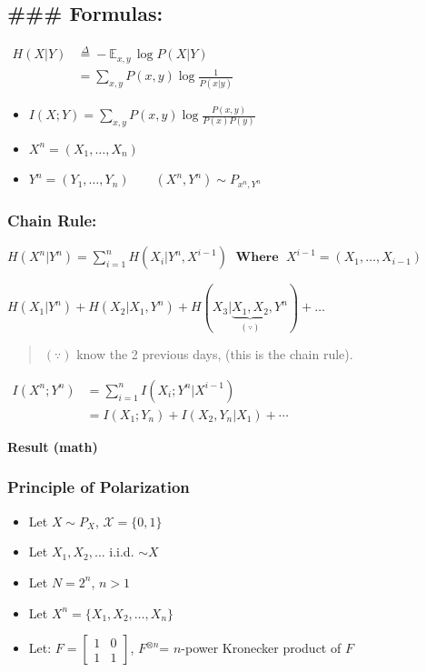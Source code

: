 \documentclass[11pt]{article}
\begin{document}
\subsection{\#\#\# Formulas:}\label{formulas}

\(\begin{align} H(X | Y) &\overset{\Delta}{=} -\mathbb{E}_{x,y} \, \log P(X | Y) \\ &= \sum_{x, y} P(x, y) \log \frac{1}{P(x | y)} \end{align}\)

\begin{itemize}
\item
  \(I(X; Y) = \sum\limits_{x, y} P(x, y) \log \frac{P(x, y)}{P(x) P(y)}\)
\item
  \(X^n = (X_1, \dots, X_n)\)
\item
  \(Y^n = (Y_1, \dots, Y_n)\)\(\qquad (X^n,Y^n) \sim P_{x^n,Y^n}\)
\end{itemize}

\subsubsection{Chain Rule:}\label{chain-rule}

\(\boxed{ H(X^n | Y^n) = \sum\limits_{i=1}^n H(X_i | Y^n, X^{i-1}) \; \textbf{ Where } \; X^{i-1} = (X_1, \dots, X_{i-1})}\)

    \(H(X_1 | Y^n) + H(X_2 | X_1, Y^n) + H(X_3 | \underbrace{X_1, X_2}_{(\because)}, Y^n) + \dots\)

\begin{quote}
\((\because)\) know the 2 previous days, (this is the chain rule).
\end{quote}

\(\begin{align} I(X^n; Y^n) &= \sum\limits_{i=1}^n I(X_i; Y^n | X^{i-1}) \\ &= I(X_1; Y_n) + I(X_2, Y_n| X_1) + \cdots \end{align}\)

    \textbf{Result (math)}

\subsubsection{Principle of
Polarization}\label{principle-of-polarization}

\begin{itemize}
\item
  Let \(X \sim P_X\), \(\mathcal{X} = \{0, 1\}\)
\item
  Let \(X_1, X_2, \dots\) i.i.d. \(\sim X\)
\item
  Let \(N = 2^n\), \(n > 1\)
\item
  Let \(X^n = \{X_1, X_2, \dots, X_n\}\)
\item
  Let: \(F = \begin{bmatrix} 1 & 0 \\ 1 & 1 \end{bmatrix}\),
  \(F^{\otimes n}\)= \(n\)-power Kronecker product of \(F\)
\end{itemize}
\end{document}
